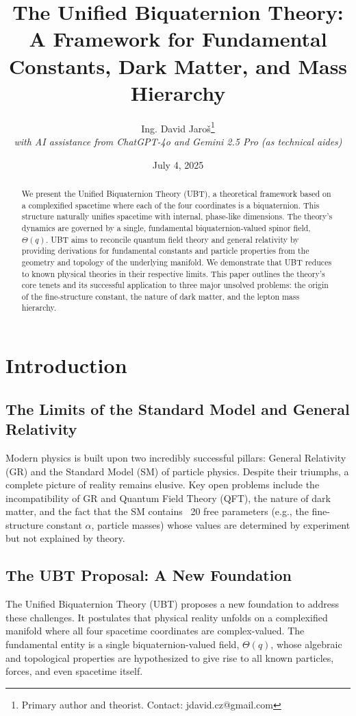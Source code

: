 \documentclass[12pt, a4paper]{article}
\title{\textbf{The Unified Biquaternion Theory: A Framework for Fundamental Constants, Dark Matter, and Mass Hierarchy}}
\author{Ing. David Jaroš\thanks{Primary author and theorist. Contact: jdavid.cz@gmail.com} \\
\textit{with AI assistance from ChatGPT-4o and Gemini 2.5 Pro (as technical aides)}}
\date{July 4, 2025}
\begin{document}
\maketitle

\begin{abstract}
We present the Unified Biquaternion Theory (UBT), a theoretical framework based on a complexified spacetime where each of the four coordinates is a biquaternion. This structure naturally unifies spacetime with internal, phase-like dimensions. The theory's dynamics are governed by a single, fundamental biquaternion-valued spinor field, \( \Theta(q) \). UBT aims to reconcile quantum field theory and general relativity by providing derivations for fundamental constants and particle properties from the geometry and topology of the underlying manifold. We demonstrate that UBT reduces to known physical theories in their respective limits. This paper outlines the theory's core tenets and its successful application to three major unsolved problems: the origin of the fine-structure constant, the nature of dark matter, and the lepton mass hierarchy.
\end{abstract}

\tableofcontents
\newpage

\section{Introduction}

\subsection{The Limits of the Standard Model and General Relativity}
Modern physics is built upon two incredibly successful pillars: General Relativity (GR) and the Standard Model (SM) of particle physics. Despite their triumphs, a complete picture of reality remains elusive. Key open problems include the incompatibility of GR and Quantum Field Theory (QFT), the nature of dark matter, and the fact that the SM contains ~20 free parameters (e.g., the fine-structure constant \(\alpha\), particle masses) whose values are determined by experiment but not explained by theory.

\subsection{The UBT Proposal: A New Foundation}
The Unified Biquaternion Theory (UBT) proposes a new foundation to address these challenges. It postulates that physical reality unfolds on a complexified manifold where all four spacetime coordinates are complex-valued. The fundamental entity is a single biquaternion-valued field, \( \Theta(q) \), whose algebraic and topological properties are hypothesized to give rise to all known particles, forces, and even spacetime itself.
\end{document}
